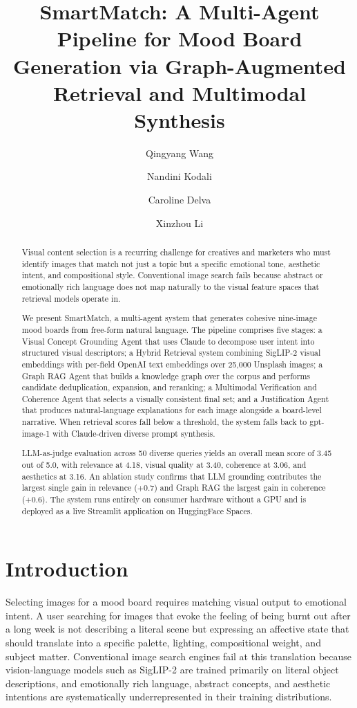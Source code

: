 \documentclass[
  11pt,
]{article}
\title{SmartMatch: A Multi-Agent Pipeline for Mood Board Generation via
Graph-Augmented Retrieval and Multimodal Synthesis}
\author{Qingyang Wang \and Nandini Kodali \and Caroline
Delva \and Xinzhou Li}
\date{}
\begin{document}
\maketitle
\begin{abstract}
Visual content selection is a recurring challenge for creatives and
marketers who must identify images that match not just a topic but a
specific emotional tone, aesthetic intent, and compositional style.
Conventional image search fails because abstract or emotionally rich
language does not map naturally to the visual feature spaces that
retrieval models operate in.

We present SmartMatch, a multi-agent system that generates cohesive
nine-image mood boards from free-form natural language. The pipeline
comprises five stages: a Visual Concept Grounding Agent that uses Claude
to decompose user intent into structured visual descriptors; a Hybrid
Retrieval system combining SigLIP-2 visual embeddings with per-field
OpenAI text embeddings over 25,000 Unsplash images; a Graph RAG Agent
that builds a knowledge graph over the corpus and performs candidate
deduplication, expansion, and reranking; a Multimodal Verification and
Coherence Agent that selects a visually consistent final set; and a
Justification Agent that produces natural-language explanations for each
image alongside a board-level narrative. When retrieval scores fall
below a threshold, the system falls back to gpt-image-1 with
Claude-driven diverse prompt synthesis.

LLM-as-judge evaluation across 50 diverse queries yields an overall mean
score of 3.45 out of 5.0, with relevance at 4.18, visual quality at
3.40, coherence at 3.06, and aesthetics at 3.16. An ablation study
confirms that LLM grounding contributes the largest single gain in
relevance (+0.7) and Graph RAG the largest gain in coherence (+0.6). The
system runs entirely on consumer hardware without a GPU and is deployed
as a live Streamlit application on HuggingFace Spaces.
\end{abstract}

\section{Introduction}\label{introduction}

Selecting images for a mood board requires matching visual output to
emotional intent. A user searching for images that evoke the feeling of
being burnt out after a long week is not describing a literal scene but
expressing an affective state that should translate into a specific
palette, lighting, compositional weight, and subject matter.
Conventional image search engines fail at this translation because
vision-language models such as SigLIP-2 are trained primarily on literal
object descriptions, and emotionally rich language, abstract concepts,
and aesthetic intentions are systematically underrepresented in their
training distributions.
\end{document}
